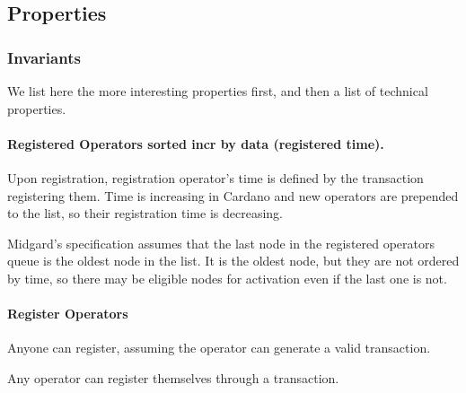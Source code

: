 \subsection{Properties}

\subsubsection{Invariants}\label{sec:opdir:invariants}

We list here the more interesting properties first, and then a list of technical
properties.

\paragraph{Registered Operators sorted incr by data (registered time).}
%
Upon registration, registration operator's time is defined by the transaction
registering them.
%
Time is increasing in Cardano and new operators are prepended to the list, so
their registration time is decreasing.


Midgard's specification assumes that the last node in the registered operators
queue is the oldest node in the list.
%
It is the oldest node, but they are not ordered by time, so there may be
eligible nodes for activation even if the last one is not.


\paragraph{Register Operators}

Anyone can register, assuming the operator can generate a valid transaction.

\begin{theorem}
  \label{thm:OperatorDirectory.Properties.Registered.AnyoneCanRegister}
  \leanok
  Any operator can register themselves through a transaction.
  \end{theorem}

